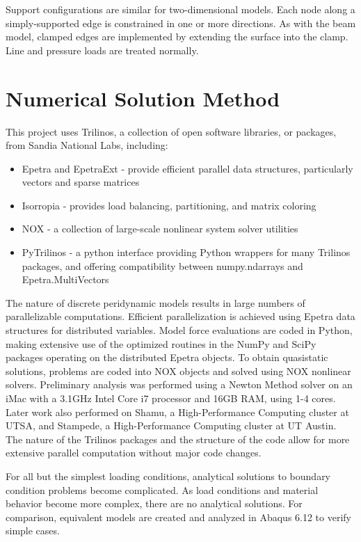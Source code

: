 Support configurations are similar for two-dimensional models.
Each node along a simply-supported edge is constrained in one or more directions.
As with the beam model, clamped edges are implemented by extending the surface into the clamp.
Line and pressure loads are treated normally.

\section{Numerical Solution Method}

This project uses Trilinos, a collection of open software libraries, or packages, from Sandia National Labs, including:
\begin{itemize}
  \item Epetra and EpetraExt - provide efficient parallel data structures, particularly vectors and sparse matrices
  \item Isorropia - provides load balancing, partitioning, and matrix coloring
  \item NOX - a collection of large-scale nonlinear system solver utilities
  \item PyTrilinos - a python interface providing Python wrappers for many Trilinos packages, and offering compatibility between numpy.ndarrays and Epetra.MultiVectors
\end{itemize}

The nature of discrete peridynamic models results in large numbers of parallelizable computations.
Efficient parallelization is achieved using Epetra data structures for distributed variables.
Model force evaluations are coded in Python, making extensive use of the optimized routines in the NumPy and SciPy packages operating on the distributed Epetra objects. 
To obtain quasistatic solutions, problems are coded into NOX objects and solved using NOX nonlinear solvers.
Preliminary analysis was performed using a Newton Method solver on an iMac with a 3.1GHz Intel Core i7 processor and 16GB RAM, using 1-4 cores.
Later work also performed on Shamu, a High-Performance Computing cluster at UTSA, and Stampede, a High-Performance Computing cluster at UT Austin.
The nature of the Trilinos packages and the structure of the code allow for more extensive parallel computation without major code changes.

For all but the simplest loading conditions, analytical solutions to boundary condition problems become complicated.
As load conditions and material behavior become more complex, there are no analytical solutions.
For comparison, equivalent models are created and analyzed in Abaqus 6.12 to verify simple cases.
